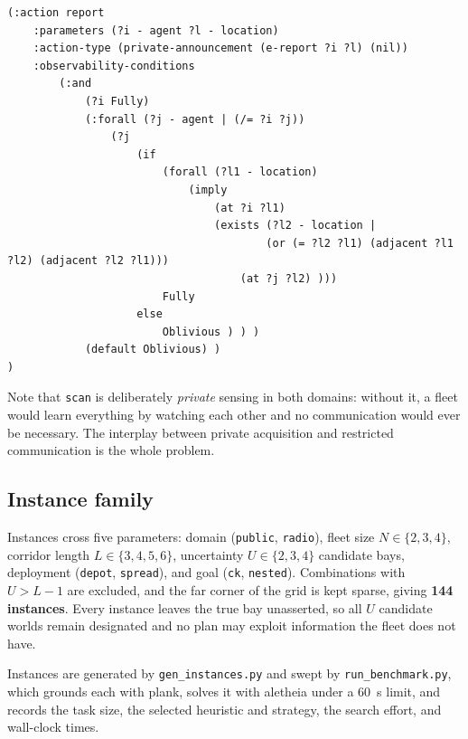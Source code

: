\documentclass[11pt,a4paper]{article}
\theoremstyle{definition}
\begin{document}
\begin{lstlisting}[caption={Range-limited radio: observability as a formula. A
vehicle hears the report iff it shares a bay with the sender or occupies an
adjacent one; otherwise it is oblivious to the transmission.}, captionpos=b]
(:action report
    :parameters (?i - agent ?l - location)
    :action-type (private-announcement (e-report ?i ?l) (nil))
    :observability-conditions
        (:and
            (?i Fully)
            (:forall (?j - agent | (/= ?i ?j))
                (?j
                    (if
                        (forall (?l1 - location)
                            (imply
                                (at ?i ?l1)
                                (exists (?l2 - location |
                                        (or (= ?l2 ?l1) (adjacent ?l1 ?l2) (adjacent ?l2 ?l1)))
                                    (at ?j ?l2) )))
                        Fully
                    else
                        Oblivious ) ) )
            (default Oblivious) )
)
\end{lstlisting}

Note that \texttt{scan} is deliberately \emph{private} sensing in both domains:
without it, a fleet would learn everything by watching each other and no
communication would ever be necessary. The interplay between private
acquisition and restricted communication is the whole problem.

\subsection{Instance family}

Instances cross five parameters: domain (\texttt{public}, \texttt{radio}),
fleet size $N\in\{2,3,4\}$, corridor length $L\in\{3,4,5,6\}$, uncertainty
$U\in\{2,3,4\}$ candidate bays, deployment (\texttt{depot}, \texttt{spread}),
and goal (\texttt{ck}, \texttt{nested}). Combinations with $U > L-1$ are
excluded, and the far corner of the grid is kept sparse, giving
\textbf{144 instances}. Every instance leaves the true bay unasserted, so all
$U$ candidate worlds remain designated and no plan may exploit information the
fleet does not have.

Instances are generated by \texttt{gen\_instances.py} and swept by
\texttt{run\_benchmark.py}, which grounds each with \textsf{plank}, solves it
with \textsf{aletheia} under a 60~s limit, and records the task size, the
selected heuristic and strategy, the search effort, and wall-clock times.


\end{document}
